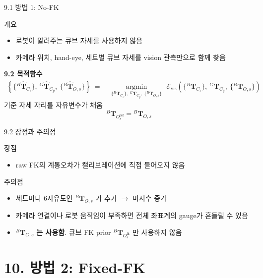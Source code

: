 \documentclass[aspectratio=169,11pt]{beamer}
\newcommand{\T}[3][]{{}^{#2}\mathbf{T}^{#1}_{#3}}   %
\newcommand{\Th}[3][]{{}^{#2}\widehat{\mathbf{T}}^{#1}_{#3}} %
\newcommand{\Oref}{O^{\mathrm{ref}}}   %
\newcommand{\Ofk}{O^{\mathrm{fk}}}     %
\begin{document}
\begin{frame}{9.1 방법 1: No-FK}
  \begin{block}{개요}
    \begin{itemize}
      \item 로봇이 알려주는 큐브 자세를 사용하지 않음
      \item 카메라 위치, hand-eye, 세트별 큐브 자세를 vision 관측만으로 함께 찾음
    \end{itemize}
  \end{block}
  \vfill
  \textbf{9.2 목적함수}
  {\footnotesize
  \[
    \begin{aligned}
      \left\{
        \{\Th{B}{C_i}\},\ \Th{G}{C_g},\ \{\Th{B}{O,s}\}
      \right\}
      \ =\ &
      \underset{
        \{\T{B}{C_i}\},\ \T{G}{C_g},\ \{\T{B}{O,s}\}
      }{\operatorname{argmin}}
      \ \,
      \mathcal{E}_{\mathrm{vis}}
      \left(
        \{\T{B}{C_i}\},\ \T{G}{C_g},\ \{\T{B}{O,s}\}
      \right)
    \end{aligned}
  \]
  }
  \vfill
  기준 자세 자리를 자유변수가 채움
  \[
    \T{B}{\Oref_s}=\T{B}{O,s}
  \]
\end{frame}

\begin{frame}{9.2 장점과 주의점}
  \begin{block}{장점}
    \begin{itemize}
      \item raw FK의 계통오차가 캘리브레이션에 직접 들어오지 않음
    \end{itemize}
  \end{block}
  \vfill
  \begin{block}{주의점}
    \begin{itemize}
      \item 세트마다 $6$자유도인 $\T{B}{O,s}$ 가 추가 $\rightarrow$ 미지수 증가
      \item 카메라 연결이나 로봇 움직임이 부족하면 전체 좌표계의 gauge가 흔들릴 수 있음
      \item $\T{B}{G,e}$ \textbf{는 사용함}.
        큐브 FK prior $\T{B}{\Ofk_s}$ 만 사용하지 않음
    \end{itemize}
  \end{block}
\end{frame}

\section{10. 방법 2: Fixed-FK}
\end{document}

